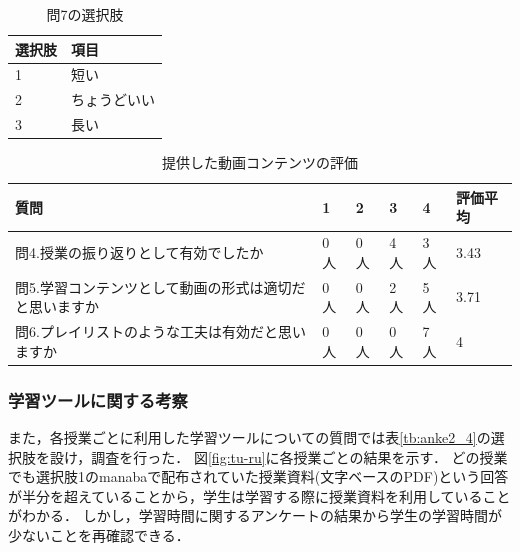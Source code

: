 \documentclass[12pt,a4j,titlepage]{ltjsarticle}
\begin{document}
\begin{table}[htbp]
  \caption{問7の選択肢}
  \begin{center}
\begin{tabular}{ll}\hline
選択肢 & 項目\\ \hline
               1 & 短い \\ 
               2 & ちょうどいい\\
               3 & 長い\\
              \hline
               \end{tabular}
               \end{center}
               \label{tb:anke2_5}
               \end{table}

\begin{table}[htbp]
  \caption{提供した動画コンテンツの評価}
  \begin{center}
\begin{tabular}{l|llll|l}\hline
               質問 & 1 & 2 & 3 & 4 & 評価平均 \\ \hline
               問4.授業の振り返りとして有効でしたか & 0人 & 0人 & 4人 & 3人 & 3.43\\
               問5.学習コンテンツとして動画の形式は適切だと思いますか & 0人 & 0人 & 2人 & 5人 & 3.71\\
               問6.プレイリストのような工夫は有効だと思いますか & 0人 & 0人 & 0人 & 7人 & 4\\
              \hline
               \end{tabular}
               \end{center}
               \label{tb:anke2_6}
               \end{table}

\clearpage

\subsubsection{学習ツールに関する考察}
また，各授業ごとに利用した学習ツールについての質問では表\ref{tb:anke2_4}の選択肢を設け，調査を行った．
図\ref{fig:tu-ru}に各授業ごとの結果を示す．
どの授業でも選択肢1のmanabaで配布されていた授業資料(文字ベースのPDF)という回答が半分を超えていることから，学生は学習する際に授業資料を利用していることがわかる．
しかし，学習時間に関するアンケートの結果から学生の学習時間が少ないことを再確認できる．

\end{document}
